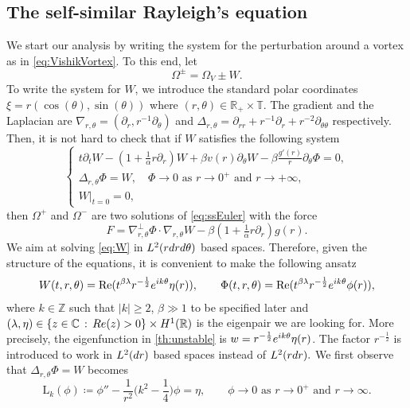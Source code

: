 \documentclass[11pt,reqno]{amsproc}
\def\dd{{\rm d}}
\def\e{{\rm e}}
\def\de{{\partial}}
\def\RR {\mathbb{R}}
\def\TT {\mathbb{T}}
\def\ZZ {\mathbb{Z}}
\def\Re{{\rm Re}}
\newcommand{\rmL}{\mathrm{L}}
\theoremstyle{definition}
\theoremstyle{definition}
\numberwithin{equation}{section}
\begin{document}
\subsection{The self-similar Rayleigh's equation} We start our analysis by writing the system for the perturbation around a vortex as in \cref{eq:VishikVortex}. To this end, let
$$\Omega^\pm=\Omega_V\pm W.$$ 
To write the system for $W$, we introduce the standard polar coordinates $\xi=r(\cos(\theta),\sin(\theta))$ where $(r,\theta)\in \RR_+\times \TT$. The gradient and the Laplacian are  $\nabla_{r,\theta}=(\de_r,r^{-1}\de_\theta)$ and $\Delta_{r,\theta}=\de_{rr}+r^{-1}\de_r+r^{-2}\de_{\theta \theta}$ respectively. Then, it is not hard to check that if $W$ satisfies the following system 
\begin{equation}
    \label{eq:W}
\begin{cases}
    t\de_tW-(1+\tfrac{1}{\alpha}r\de_r)W+\beta v(r)\de_\theta W-\beta\tfrac{g'(r)}{r}\de_\theta \Phi=0,\\
    \Delta_{r,\theta} \Phi=W, \quad \Phi \to 0 \text{ as } r\to 0^+ \text{ and } r\to +\infty,\\
    W|_{t=0}=0, 
\end{cases}
\end{equation}
then $\Omega^+$ and $\Omega^-$ are two solutions of \cref{eq:ssEuler} with the force 
\begin{equation}
\label{eq:F}
F=\nabla^\perp_{r,\theta} \Phi\cdot \nabla_{r,\theta} W-\beta(1+\tfrac{1}{\alpha}r
\de_r)g(r).
\end{equation}
We aim at solving \cref{eq:W} in $L^2(r\dd r \dd \theta)$ based spaces. Therefore, given the structure of the equations, it is convenient to make the following ansatz \begin{align}
\label{eq:WPhi}
    W(t,r,\theta)=\mathrm{Re}(t^{\beta \lambda}r^{-\frac12}\e^{ik\theta}\eta(r)), \qquad \Phi(t,r,\theta)=\mathrm{Re}(t^{\beta \lambda}r^{-\frac12}\e^{ik\theta}\phi(r)),
\end{align}
where $k\in \ZZ$ such that $|k|\geq 2$, $\beta\gg 1$ to be specified later and $(\lambda,\eta)\in \{z\in \mathbb{C}\, :\,\Re(z)>0\}\times H^1(\RR)$ is the eigenpair we are looking for. More precisely, the eigenfunction  in \cref{th:unstable} is $w=r^{-\frac12}\e^{ik\theta}\eta(r)$. The factor $r^{-\frac12}$ is introduced to work in $L^2(\dd r)$ based spaces instead of $L^2(r\dd r).$ We first observe that $\Delta_{r,\theta}\Phi=W$ becomes 
\begin{equation}
\rmL_k(\phi)\coloneqq\phi''-\frac{1}{r^2}\big(k^2-\frac14\big)\phi=\eta, \qquad \phi\to 0  \text{ as } r\to 0^+ \text{ and } r\to \infty.
\end{equation}
\end{document}
